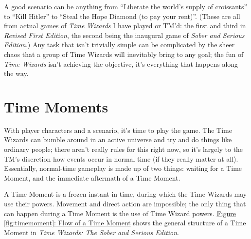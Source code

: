 \documentclass{article}
\newcommand{\twsse}{\emph{Time Wizards: The Sober and Serious Edition}}
\newcommand{\tw}{\emph{Time Wizards}}
\newcommand{\sse}{\emph{Sober and Serious Edition}}
\newcommand{\rfe}{\emph{Revised First Edition}}
\begin{document}
A good scenario can be anything from ``Liberate the world's supply of croissants'' to ``Kill
Hitler'' to ``Steal the Hope Diamond (to pay your rent)''. (These are all from actual games of
\tw{} I have played or TM'd: the first and third in \rfe{}, the second being the inaugural game
of \sse{}.) Any task that isn't trivially simple can be complicated by the sheer chaos that a
group of Time Wizards will inevitably bring to any goal; the fun of \tw{} isn't achieving the
objective, it's everything that happens along the way.

\section{Time Moments} \label{sec:time-moment}
With player characters and a scenario, it's time to play the game. The Time Wizards can bumble
around in an active universe and try and do things like ordinary people; there aren't really
rules for this right now, so it's largely to the TM's discretion how events occur in normal time
(if they really matter at all). Essentially, normal-time gameplay is made up of two things:
waiting for a Time Moment, and the immediate aftermath of a Time Moment.

A Time Moment is a frozen instant in time, during which the Time Wizards may use their powers.
Movement and direct action are impossible; the only thing that can happen during a Time Moment
is the use of Time Wizard powers. \hyperref[fig:timemoment]{Figure \ref*{fig:timemoment}: Flow
of a Time Moment} shows the general structure of a Time Moment in \twsse{}.
\end{document}
